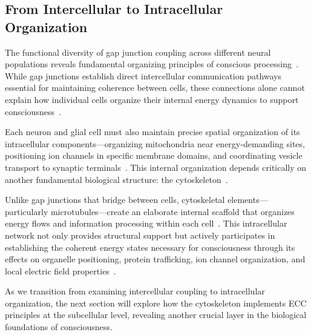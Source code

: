 \subsection*{From Intercellular to Intracellular Organization~~}

The functional diversity of gap junction coupling across different neural populations reveals fundamental organizing principles of conscious processing~\cite{Connors2004, Verkhratsky2018}. While gap junctions establish direct intercellular communication pathways essential for maintaining coherence between cells, these connections alone cannot explain how individual cells organize their internal energy dynamics to support consciousness~\cite{Bennett2004, Nielsen2012}.

Each neuron and glial cell must also maintain precise spatial organization of its intracellular components—organizing mitochondria near energy-demanding sites, positioning ion channels in specific membrane domains, and coordinating vesicle transport to synaptic terminals~\cite{Attwell2001, Giaume2010}. This internal organization depends critically on another fundamental biological structure: the cytoskeleton~\cite{Fletcher2010, Kapitein2015}.

Unlike gap junctions that bridge between cells, cytoskeletal elements—particularly microtubules—create an elaborate internal scaffold that organizes energy flows and information processing within each cell~\cite{Baas2011, Howard2003}. This intracellular network not only provides structural support but actively participates in establishing the coherent energy states necessary for consciousness through its effects on organelle positioning, protein trafficking, ion channel organization, and local electric field properties~\cite{Hameroff2014, pinotsis2023cytoelectric}.

As we transition from examining intercellular coupling to intracellular organization, the next section will explore how the cytoskeleton implements ECC principles at the subcellular level, revealing another crucial layer in the biological foundations of consciousness.
